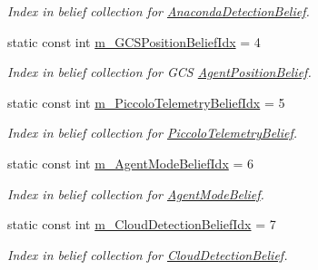 \begin{DoxyCompactItemize}
\begin{DoxyCompactList}\small\item\em Index in belief collection for \hyperlink{class_anaconda_detection_belief}{AnacondaDetectionBelief}. \end{DoxyCompactList}\item 
\hypertarget{class_belief_collection_addba5d38789f317f3d2ef8633ef814df}{
static const int \hyperlink{class_belief_collection_addba5d38789f317f3d2ef8633ef814df}{m\_\-GCSPositionBeliefIdx} = 4}
\label{class_belief_collection_addba5d38789f317f3d2ef8633ef814df}

\begin{DoxyCompactList}\small\item\em Index in belief collection for GCS \hyperlink{class_agent_position_belief}{AgentPositionBelief}. \end{DoxyCompactList}\item 
\hypertarget{class_belief_collection_ac7592f4d9ffd26a5371c76ff942be59b}{
static const int \hyperlink{class_belief_collection_ac7592f4d9ffd26a5371c76ff942be59b}{m\_\-PiccoloTelemetryBeliefIdx} = 5}
\label{class_belief_collection_ac7592f4d9ffd26a5371c76ff942be59b}

\begin{DoxyCompactList}\small\item\em Index in belief collection for \hyperlink{class_piccolo_telemetry_belief}{PiccoloTelemetryBelief}. \end{DoxyCompactList}\item 
\hypertarget{class_belief_collection_a403a39b541bd09fc8acc354cbf9af11c}{
static const int \hyperlink{class_belief_collection_a403a39b541bd09fc8acc354cbf9af11c}{m\_\-AgentModeBeliefIdx} = 6}
\label{class_belief_collection_a403a39b541bd09fc8acc354cbf9af11c}

\begin{DoxyCompactList}\small\item\em Index in belief collection for \hyperlink{class_agent_mode_belief}{AgentModeBelief}. \end{DoxyCompactList}\item 
\hypertarget{class_belief_collection_a6f43134dc869a3f14e2dcc61d62193a6}{
static const int \hyperlink{class_belief_collection_a6f43134dc869a3f14e2dcc61d62193a6}{m\_\-CloudDetectionBeliefIdx} = 7}
\label{class_belief_collection_a6f43134dc869a3f14e2dcc61d62193a6}

\begin{DoxyCompactList}\small\item\em Index in belief collection for \hyperlink{class_cloud_detection_belief}{CloudDetectionBelief}. \end{DoxyCompactList}\end{DoxyCompactItemize}



